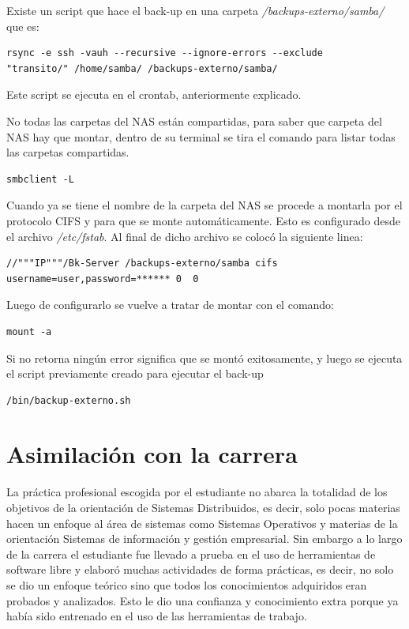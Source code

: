 \documentclass[12pt,a4paper]{article}
\begin{document}
Existe un script que hace el back-up en una carpeta \textit{/backups-externo/samba/} que es:

\begin{lstlisting}
rsync -e ssh -vauh --recursive --ignore-errors --exclude 
"transito/" /home/samba/ /backups-externo/samba/
\end{lstlisting}

Este script se ejecuta en el crontab, anteriormente explicado.

No todas las carpetas del NAS están compartidas, para saber que carpeta del NAS hay que montar, dentro de su terminal se tira el comando para listar todas las carpetas compartidas.

\begin{lstlisting}
smbclient -L 
\end{lstlisting}
 
Cuando ya se tiene el nombre de la carpeta del NAS se procede a montarla por el protocolo CIFS y para que se monte automáticamente. Esto es configurado desde el archivo \textit{/etc/fstab}. Al final de dicho archivo se colocó la siguiente linea:

\begin{lstlisting}
//"""IP"""/Bk-Server /backups-externo/samba	cifs	
username=user,password=****** 0  0 
\end{lstlisting}

Luego de configurarlo se vuelve a tratar de montar con el comando:

\begin{lstlisting}
mount -a
\end{lstlisting}

Si no retorna ningún error significa que se montó exitosamente, y luego se ejecuta el script previamente creado para ejecutar el back-up

\begin{lstlisting}
/bin/backup-externo.sh
\end{lstlisting}

\section{Asimilación con la carrera}
La práctica profesional escogida por el estudiante no abarca la totalidad de los objetivos de la orientación de Sistemas Distribuidos, es decir, solo pocas materias hacen un enfoque al área de sistemas como Sistemas Operativos y materias de la orientación Sistemas de información y gestión empresarial. Sin embargo a lo largo de la carrera el estudiante fue llevado a prueba en el uso de herramientas de software libre y elaboró muchas actividades de forma prácticas, es decir, no solo se dio un enfoque teórico sino que todos los conocimientos adquiridos eran probados y analizados. Esto le dio una confianza y conocimiento extra porque ya había sido entrenado en el uso de las herramientas de trabajo.
\end{document}

